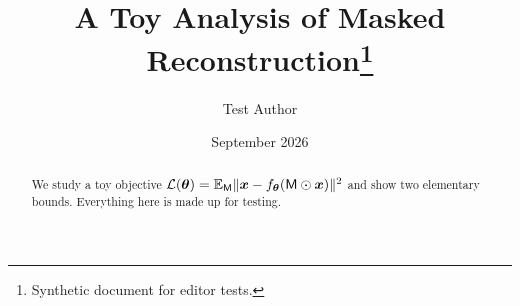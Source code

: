 \documentclass[11pt]{article}
\title{A Toy Analysis of Masked Reconstruction\thanks{Synthetic document for editor tests.}}
\author{Test Author}
\date{September 2026}
\begin{document}
\maketitle

\begin{abstract}
  We study a toy objective $\mathcal{L}(\bm{\theta}) = \operatorname*{\mathbb{E}}_{\mathsf{M}}\lVert\bm{x} - f_{\bm{\theta}}(\mathsf{M} \odot \bm{x})\rVert^2$
  and show two elementary bounds. Everything here is made up for testing.
\end{abstract}





\appendix




\end{document}
